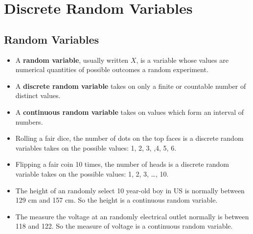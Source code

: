 
\hypertarget{discrete-random-variables}{%
\section{Discrete Random Variables}\label{discrete-random-variables}}

\hypertarget{random-variables}{%
\subsection{Random Variables}\label{random-variables}}

\begin{itemize}
\item
  A \textbf{random variable}, usually written \(X\), is a variable whose
  values are numerical quantities of possible outcomes a random
  experiment.
\item
  A \textbf{discrete random variable} takes on only a finite or
  countable number of distinct values.
\item
  A \textbf{continuous random variable} takes on values which form an
  interval of numbers.
\end{itemize}

\begin{example}

\begin{itemize}
\item
  Rolling a fair dice, the number of dots on the top faces is a discrete
  random variables takes on the possible values: 1, 2, 3, ,4, 5, 6.
\item
  Flipping a fair coin 10 times, the number of heads is a discrete
  random variable takes on the possible values: 1, 2, 3, \ldots, 10.
\end{itemize}

\end{example}

\begin{example}

\begin{itemize}
\item
  The height of an randomly select 10 year-old boy in US is normally
  between 129 cm and 157 cm. So the height is a continuous random
  variable.
\item
  The measure the voltage at an randomly electrical outlet normally is
  between 118 and 122. So the measure of voltage is a continuous random
  variable.
\end{itemize}

\end{example}

